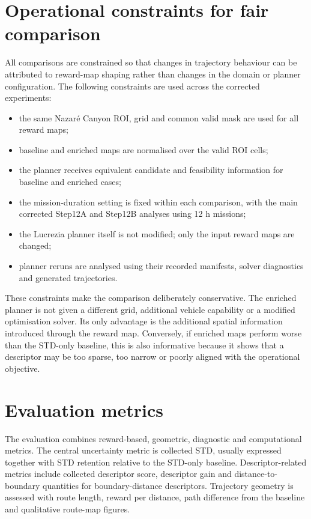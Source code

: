 \section{Operational constraints for fair comparison}

All comparisons are constrained so that changes in trajectory behaviour can be attributed to reward-map shaping rather than changes in the domain or planner configuration. The following constraints are used across the corrected experiments:

\begin{itemize}
    \item the same Nazar\'e Canyon ROI, grid and common valid mask are used for all reward maps;
    \item baseline and enriched maps are normalised over the valid ROI cells;
    \item the planner receives equivalent candidate and feasibility information for baseline and enriched cases;
    \item the mission-duration setting is fixed within each comparison, with the main corrected Step12A and Step12B analyses using 12 h missions;
    \item the Lucrezia planner itself is not modified; only the input reward maps are changed;
    \item planner reruns are analysed using their recorded manifests, solver diagnostics and generated trajectories.
\end{itemize}

These constraints make the comparison deliberately conservative. The enriched planner is not given a different grid, additional vehicle capability or a modified optimisation solver. Its only advantage is the additional spatial information introduced through the reward map. Conversely, if enriched maps perform worse than the STD-only baseline, this is also informative because it shows that a descriptor may be too sparse, too narrow or poorly aligned with the operational objective.

\section{Evaluation metrics}

The evaluation combines reward-based, geometric, diagnostic and computational metrics. The central uncertainty metric is collected STD, usually expressed together with STD retention relative to the STD-only baseline. Descriptor-related metrics include collected descriptor score, descriptor gain and distance-to-boundary quantities for boundary-distance descriptors. Trajectory geometry is assessed with route length, reward per distance, path difference from the baseline and qualitative route-map figures.

